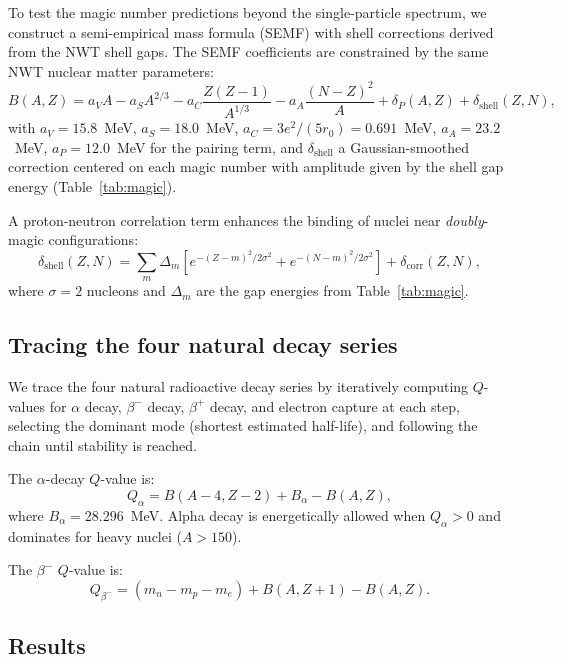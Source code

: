 \documentclass[11pt,a4paper]{article}
\begin{document}
To test the magic number predictions beyond the single-particle spectrum,
we construct a semi-empirical mass formula (SEMF) with shell corrections
derived from the NWT shell gaps.  The SEMF coefficients are constrained
by the same NWT nuclear matter parameters:
\begin{equation}
  B(A,Z) = a_V A - a_S A^{2/3} - a_C\frac{Z(Z-1)}{A^{1/3}}
  - a_A\frac{(N-Z)^2}{A} + \delta_P(A,Z) + \delta_{\text{shell}}(Z,N),
  \label{eq:semf}
\end{equation}
with $a_V = 15.8$~MeV, $a_S = 18.0$~MeV,
$a_C = 3e^2/(5r_0) = 0.691$~MeV, $a_A = 23.2$~MeV,
$a_P = 12.0$~MeV for the pairing term, and $\delta_{\text{shell}}$ a
Gaussian-smoothed correction centered on each magic number with amplitude
given by the shell gap energy (Table~\ref{tab:magic}).

A proton-neutron correlation term enhances the binding of nuclei near
\emph{doubly}-magic configurations:
\begin{equation}
  \delta_{\text{shell}}(Z,N) = \sum_m \Delta_m
  \left[e^{-(Z-m)^2/2\sigma^2} + e^{-(N-m)^2/2\sigma^2}\right]
  + \delta_{\text{corr}}(Z,N),
  \label{eq:shell-corr}
\end{equation}
where $\sigma = 2$ nucleons and $\Delta_m$ are the gap energies from
Table~\ref{tab:magic}.

\subsection{Tracing the four natural decay series}

We trace the four natural radioactive decay series by iteratively computing
$Q$-values for $\alpha$ decay, $\beta^-$ decay, $\beta^+$ decay, and
electron capture at each step, selecting the dominant mode (shortest
estimated half-life), and following the chain until stability is reached.

The $\alpha$-decay $Q$-value is:
\begin{equation}
  Q_\alpha = B(A-4,Z-2) + B_\alpha - B(A,Z),
\end{equation}
where $B_\alpha = 28.296$~MeV.  Alpha decay is energetically allowed when
$Q_\alpha > 0$ and dominates for heavy nuclei ($A > 150$).

The $\beta^-$ $Q$-value is:
\begin{equation}
  Q_{\beta^-} = (m_n - m_p - m_e) + B(A,Z+1) - B(A,Z).
\end{equation}

\subsection{Results}
\end{document}
